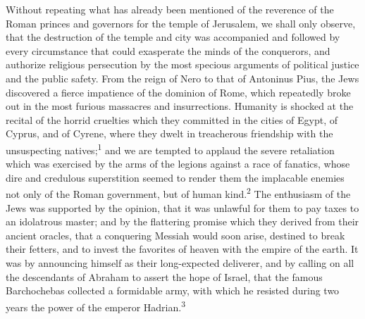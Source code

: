 Without repeating what has already been mentioned of the
reverence of the Roman princes and governors for the temple of
Jerusalem, we shall only observe, that the destruction of the
temple and city was accompanied and followed by every
circumstance that could exasperate the minds of the conquerors,
and authorize religious persecution by the most specious
arguments of political justice and the public safety. From the
reign of Nero to that of Antoninus Pius, the Jews discovered a
fierce impatience of the dominion of Rome, which repeatedly broke
out in the most furious massacres and insurrections. Humanity is
shocked at the recital of the horrid cruelties which they
committed in the cities of Egypt, of Cyprus, and of Cyrene, where
they dwelt in treacherous friendship with the unsuspecting
natives;\textsuperscript{1} and we are tempted to applaud the severe retaliation
which was exercised by the arms of the legions against a race of
fanatics, whose dire and credulous superstition seemed to render
them the implacable enemies not only of the Roman government, but
of human kind.\textsuperscript{2} The enthusiasm of the Jews was supported by the
opinion, that it was unlawful for them to pay taxes to an
idolatrous master; and by the flattering promise which they
derived from their ancient oracles, that a conquering Messiah
would soon arise, destined to break their fetters, and to invest
the favorites of heaven with the empire of the earth. It was by
announcing himself as their long-expected deliverer, and by
calling on all the descendants of Abraham to assert the hope of
Israel, that the famous Barchochebas collected a formidable army,
with which he resisted during two years the power of the emperor
Hadrian.\textsuperscript{3}



